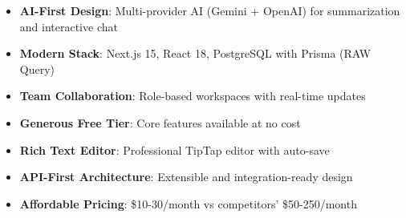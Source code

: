 \begin{itemize}[leftmargin=*,topsep=5pt,itemsep=3pt]
    \item \textbf{AI-First Design}: Multi-provider AI (Gemini + OpenAI) for summarization and interactive chat
    \item \textbf{Modern Stack}: Next.js 15, React 18, PostgreSQL with Prisma (RAW Query)
    \item \textbf{Team Collaboration}: Role-based workspaces with real-time updates
    \item \textbf{Generous Free Tier}: Core features available at no cost
    \item \textbf{Rich Text Editor}: Professional TipTap editor with auto-save
    \item \textbf{API-First Architecture}: Extensible and integration-ready design
    \item \textbf{Affordable Pricing}: \$10-30/month vs competitors' \$50-250/month
\end{itemize}
